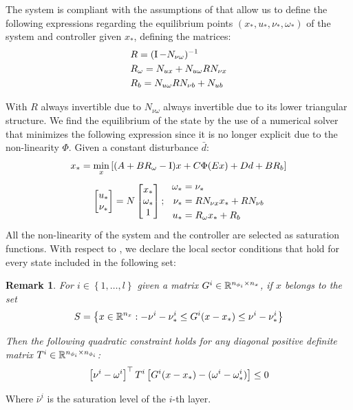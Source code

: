 \documentclass{ifacconf}
\theoremstyle{plain}
\newtheorem{remark}{Remark}
\begin{document}
The system is compliant with the assumptions of \citep[Lemma 2]{css-extended} that allow us to define the following expressions regarding the equilibrium points $\left( x_*, u_*, \nu_*, \omega_* \right)$ of the system and controller given $x_*$, defining the matrices:
\begin{equation}
    \begin{aligned}
         &R = (\operatorname{I} - N_{\nu \omega})^{-1}\\
         &R_{\omega} = N_{u x} + N_{u \omega} R N_{\nu x}\\
         &R_b = N_{u \omega} R N_{\nu b} + N_{u b}
    \end{aligned}
\end{equation}

With $R$ always invertible due to $N_{\nu \omega}$ always invertible due to its lower triangular structure. We find the equilibrium of the state by the use of a numerical solver that minimizes the following expression since it is no longer explicit due to the non-linearity $\Phi$. Given a constant disturbance $\bar{d}$:
\begin{equation}
  x_* = \min_{x} \left[(A + B R_{\omega} - \operatorname{I}) x + C \Phi(E x) + D \relax{d} + B R_b \right]
\end{equation}
\begin{equation}\label{eqn:equilibrium}
  \left[\begin{matrix}u_* \\ \nu_*\end{matrix}\right] = N \left[\begin{matrix}x_* \\ \omega_* \\ 1\end{matrix}\right]; \ \  
  \begin{aligned}
    \omega_* &= \nu_*\\
    \nu_* &= R N_{\nu x} x_* + R N_{\nu b}\\
    u_* &= R_{\omega} x_* + R_b
  \end{aligned}
\end{equation}
All the non-linearity of the system and the controller are selected as saturation functions. With respect to \citep[Lemma 3]{css-extended}, we declare the local sector conditions that hold for every state included in the following set:

\begin{remark}\label{rem:sec-set}
\emph{For $i \in \left\{ 1, \dots, l \right\}$ given a matrix $G^i \in {\mathbb{R}}^{n_{\phi_i} \times n_x}$, if $x$ belongs to the set}
\begin{equation}\label{eqn:inclusion-set}
S = \left\{ x \in {\mathbb{R}}^{n_x} : -\relax{\nu}^i - \relax{\nu}^i_* \leq G^i (x - x_*) \leq \relax{\nu}^i - \nu_*^i \right\} 
\end{equation}

\emph{Then the following quadratic constraint holds for any diagonal positive definite matrix $T^i \in {\mathbb{R}}^{n_{\phi_i} \times n_{\phi_i}}$:}
\begin{equation}\label{eqn:first_sec_cond}
  \left[ \nu^i - \omega^i \right]^\top T^i \left[ G^i (x - x_*) - (\omega^i - \omega^i_*) \right] \leq 0
\end{equation}\end{remark}
Where $\bar{\nu}^i$ is the saturation level of the $i$-th layer.
\end{document}

